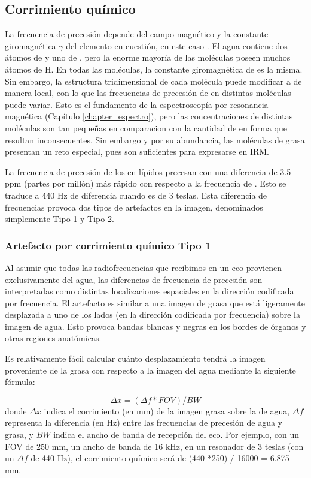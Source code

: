 \subsection{Corrimiento químico}
La frecuencia de precesión depende del campo magnético \Bzero y la constante giromagnética $\gamma$ del elemento en cuestión, en este caso . El agua contiene dos átomos de  y uno de , pero la enorme mayoría de las moléculas poseen muchos átomos de H. En todas las moléculas, la constante giromagnética de  es la misma. Sin embargo, la estructura tridimensional de cada molécula puede modificar a \Bzero de manera local, con lo que las frecuencias de precesión de  en distintas moléculas puede variar. Esto es el fundamento de la espectroscopía por resonancia magnética (Capítulo \ref{chapter_espectro}), pero las concentraciones de distintas moléculas son tan pequeñas en comparacion con la cantidad de  en forma  que resultan inconsecuentes. Sin embargo y por su abundancia, las moléculas de grasa presentan un reto especial, pues son suficientes para expresarse en IRM. 

La frecuencia de precesión de los  en lípidos precesan con una diferencia de 3.5 ppm (partes por millón) más rápido con respecto a la frecuencia de . Esto se traduce a 440 Hz de diferencia cuando \Bzero es de 3 teslas. Esta diferencia de frecuencias provoca dos tipos de artefactos en la imagen, denominados simplemente Tipo 1 y Tipo 2.

\subsubsection{Artefacto por corrimiento químico Tipo 1}
Al asumir que todas las radiofrecuencias que recibimos en un eco provienen exclusivamente del agua, las diferencias de frecuencia de precesión son interpretadas como distintas localizaciones espaciales en la dirección codificada por frecuencia. El artefacto es similar a una imagen de grasa que está ligeramente desplazada a uno de los lados (en la dirección codificada por frecuencia) sobre la imagen de agua. Esto provoca bandas blancas y negras en los bordes de órganos y otras regiones anatómicas. 

Es relativamente fácil calcular cuánto desplazamiento tendrá la imagen proveniente de la grasa con respecto a la imagen del agua mediante la siguiente fórmula:

\begin{equation}
 \Delta x = (\Delta f * FOV)/ BW
\end{equation}
donde $\Delta x$ indica el corrimiento (en mm) de la imagen grasa sobre la de agua, $\Delta f$ representa la diferencia (en Hz) entre las frecuencias de precesión de agua y grasa, y $BW$ indica el ancho de banda de recepción del eco. Por ejemplo, con un FOV de 250 mm, un ancho de banda de 16 kHz, en un resonador de 3 teslas (con un $\Delta f$ de 440 Hz), el corrimiento químico será de (440 *250) / 16000 = 6.875 mm.

